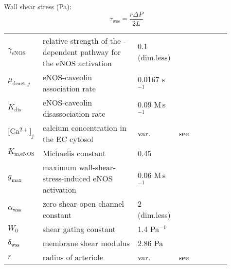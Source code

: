 \documentclass[fleqn]{report}
\numberwithin{equation}{section}
\numberwithin{equation}{section}
\newcommand{\Ca}{\text{Ca$^{2+}$}}
\newcommand{\Caj}{\text{[Ca$^{2+}]_j$}}
\newcommand{\uMpers}{\textmu M\,s$^{-1}$}
\newcommand{\n}{$^{-1}$}
\begin{document}
				Wall shear stress (Pa): %
				\begin{equation}
					\tau_{\text{wss}} = \frac{r \Delta P}{2 L}
				\end{equation}
				
					
	
	
				\begin{table}[h!]
					\centering
					\begin{tabular}{ p{0.09\linewidth}  >{\footnotesize} p{0.42\linewidth}  >{\footnotesize} p{0.17\linewidth} >{\footnotesize} p{0.23\linewidth} }
						\hline
						$ \gamma_{\text{eNOS}} $	& relative strength of the \Ca -dependent pathway for the eNOS activation	& 0.1 (dim.less)	& \citep{Comerford2008}	\\
						$ \mu_{\text{deact},j} $	& eNOS-caveolin association rate											& 0.0167 s\n		& \citep{Comerford2008}	\\
						$ K_{\text{dis}} $			& eNOS-caveolin disassociation rate											& 0.09 \uMpers		& \citep{Comerford2008}	\\
						$ \Caj $ 					& calcium concentration in the EC cytosol 									& var. 		& see \citet{Dormanns2014} \\
						$ K_{\text{m,eNOS}} $		& Michaelis constant														& 0.45 \uM			& \citep{Comerford2008}	\\
						$ g_{\max} $				& maximum wall-shear-stress-induced eNOS activation							& 0.06 \uMpers		& \citep{Comerford2008}	\\
						$ \alpha_{\text{wss}} $				& zero shear open channel constant											& 2 (dim.less)		& \citep{Comerford2008}	\\
						$ W_0 $						& shear gating constant 													& 1.4 Pa\n			& \citep{Comerford2008}	\\
						$ \delta_{\text{wss}} $		& membrane shear modulus													& 2.86 Pa		 	& \citep{Comerford2008}	\\
						$ r $						& radius of arteriole 														& var. 				& see \citet{Dormanns2014} \\

\end{tabular}
\end{table}
\end{document}
